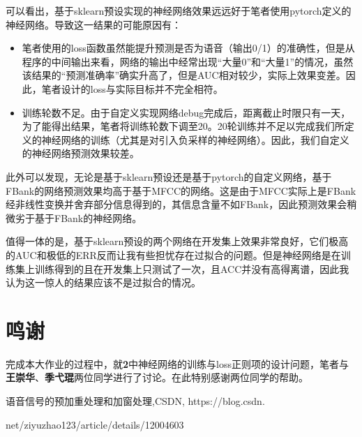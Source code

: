 \documentclass[a4paper]{article}
\begin{document}
可以看出，基于sklearn预设实现的神经网络效果远远好于笔者使用pytorch定义的神经网络。导致这一结果的可能原因有：

\begin{itemize}
    \item 笔者使用的loss函数虽然能提升预测是否为语音（输出0/1）的准确性，但是从程序的中间输出来看，网络的输出中经常出现“大量0”和“大量1”的情况，虽然该结果的“预测准确率”确实升高了，但是AUC相对较少，实际上效果变差。因此，笔者设计的loss与实际目标并不完全相符。
    \item 训练轮数不足。由于自定义实现网络debug完成后，距离截止时限只有一天，为了能得出结果，笔者将训练轮数下调至20。20轮训练并不足以完成我们所定义的神经网络的训练（尤其是对引入负采样的神经网络）。因此，我们自定义的神经网络预测效果较差。
\end{itemize}

此外可以发现，无论是基于sklearn预设还是基于pytorch的自定义网络，基于FBank的网络预测效果均高于基于MFCC的网络。这是由于MFCC实际上是FBank经非线性变换并舍弃部分信息得到的，其信息含量不如FBank，因此预测效果会稍微劣于基于FBank的神经网络。

值得一体的是，基于sklearn预设的两个网络在开发集上效果非常良好，它们极高的AUC和极低的ERR反而让我有些担忧存在过拟合的问题。但是神经网络是在训练集上训练得到的且在开发集上只测试了一次，且ACC并没有高得离谱，因此我认为这一惊人的结果应该不是过拟合的情况。

\section{鸣谢}

完成本大作业的过程中，就\textbf{2}中神经网络的训练与loss正则项的设计问题，笔者与\textbf{王崇华}、\textbf{季弋琨}两位同学进行了讨论。在此特别感谢两位同学的帮助。

\begin{thebibliography}{}

 语音信号的预加重处理和加窗处理,CSDN, https://blog.csdn.

net/ziyuzhao123/article/details/12004603

\end{thebibliography}
\end{document}
